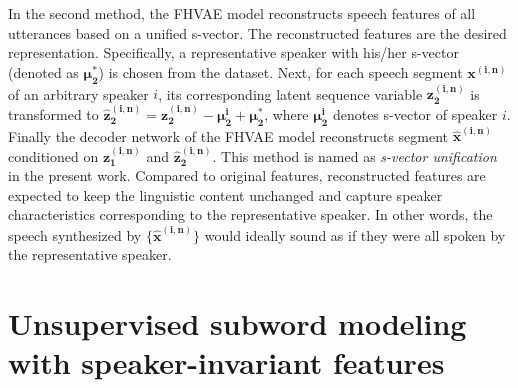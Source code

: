 \documentclass[a4paper]{article}
\begin{document}
In the second method, the FHVAE model reconstructs speech features of all utterances based on a unified s-vector. The reconstructed features are the desired representation.
Specifically, a representative speaker with his/her s-vector (denoted as $\bm{\mu_2^*}$) is chosen from the dataset. Next, for each speech segment $\bm{x^{(i,n)}}$ of an arbitrary speaker $i$, its corresponding latent sequence variable $\bm{z_2^{(i,n)}}$ is transformed to $\bm{\hat{z}_2^{(i,n)}}=\bm{z_2^{(i,n)}}-\bm{\mu_2^i}+\bm{\mu_2^*}$, where $\bm{\mu_2^{i}}$ denotes s-vector of speaker $i$. 
Finally the decoder network of the FHVAE model reconstructs segment $\bm{\hat{x}^{(i,n)}}$ conditioned on $\bm{z_1^{(i,n)}}$ and $ \bm{\hat{z}_2^{(i,n)}}$. This method is named as \emph{s-vector unification} in the present work.
Compared to original features,  reconstructed features  are expected to keep the  linguistic content unchanged and capture speaker characteristics corresponding to the representative speaker. In other words, the speech synthesized by $\{\bm{\hat{x}^{(i,n)}}\}$ would ideally sound as if they were all spoken by the representative speaker. 

\section{Unsupervised subword modeling with speaker-invariant features}
\end{document}
